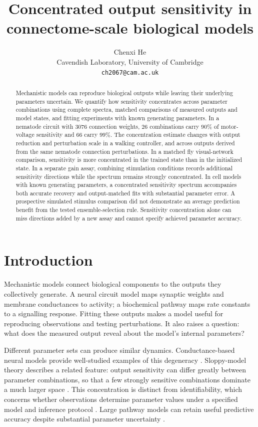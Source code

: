 \documentclass[11pt,letterpaper]{article}
\title{\textbf{Concentrated output sensitivity in connectome-scale biological models}}
\author{Chenxi He \\ Cavendish Laboratory, University of Cambridge \\ \texttt{ch2067@cam.ac.uk}}
\date{}
\begin{document}
\maketitle

\begin{abstract}
Mechanistic models can reproduce biological outputs while leaving their underlying parameters uncertain. We quantify how sensitivity concentrates across parameter combinations using complete spectra, matched comparisons of measured outputs and model states, and fitting experiments with known generating parameters. In a nematode circuit with $3076$ connection weights, $26$ combinations carry $90\%$ of motor-voltage sensitivity and $66$ carry $99\%$. The concentration estimate changes with output reduction and perturbation scale in a walking controller, and across outputs derived from the same nematode connection perturbations. In a matched fly visual-network comparison, sensitivity is more concentrated in the trained state than in the initialized state. In a separate gain assay, combining stimulation conditions records additional sensitivity directions while the spectrum remains strongly concentrated. In cell models with known generating parameters, a concentrated sensitivity spectrum accompanies both accurate recovery and output-matched fits with substantial parameter error. A prospective simulated stimulus comparison did not demonstrate an average prediction benefit from the tested ensemble-selection rule. Sensitivity concentration alone can miss directions added by a new assay and cannot specify achieved parameter accuracy.
\end{abstract}

\section*{Introduction}
Mechanistic models connect biological components to the outputs they collectively generate. A neural circuit model maps synaptic weights and membrane conductances to activity; a biochemical pathway maps rate constants to a signalling response. Fitting these outputs makes a model useful for reproducing observations and testing perturbations. It also raises a question: what does the measured output reveal about the model's internal parameters?

Different parameter sets can produce similar dynamics. Conductance-based neural models provide well-studied examples of this degeneracy \citep{prinz2004similar,goldman2001global,marder2006variability,marder2011variability}. Sloppy-model theory describes a related feature: output sensitivity can differ greatly between parameter combinations, so that a few strongly sensitive combinations dominate a much larger space \citep{brown2003statistical,gutenkunst2007universally,transtrum2015perspective}. This concentration is distinct from identifiability, which concerns whether observations determine parameter values under a specified model and inference protocol \citep{raue2009identifiability,villaverde2014reverse,chis2016sloppiness,white2016limitations}. Large pathway models can retain useful predictive accuracy despite substantial parameter uncertainty \citep{kreutz2012prediction,froehlich2018efficient}.
\end{document}
